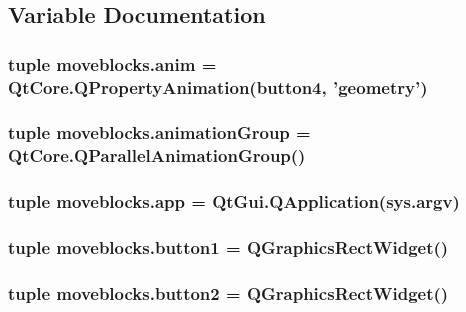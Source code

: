 \subsection{Variable Documentation}
\hypertarget{namespacemoveblocks_aecdb4d8a4bec07feb537fe9bac985194}{}
\subsubsection[{anim}]{\setlength{\rightskip}{0pt plus 5cm}tuple moveblocks.\+anim = Qt\+Core.\+Q\+Property\+Animation({\bf button4}, 'geometry')}\label{namespacemoveblocks_aecdb4d8a4bec07feb537fe9bac985194}
\hypertarget{namespacemoveblocks_afed86a88b85d3bacc416781194493969}{}
\subsubsection[{animation\+Group}]{\setlength{\rightskip}{0pt plus 5cm}tuple moveblocks.\+animation\+Group = Qt\+Core.\+Q\+Parallel\+Animation\+Group()}\label{namespacemoveblocks_afed86a88b85d3bacc416781194493969}
\hypertarget{namespacemoveblocks_ab226ea92062e404c32529795624c87d7}{}
\subsubsection[{app}]{\setlength{\rightskip}{0pt plus 5cm}tuple moveblocks.\+app = Qt\+Gui.\+Q\+Application(sys.\+argv)}\label{namespacemoveblocks_ab226ea92062e404c32529795624c87d7}
\hypertarget{namespacemoveblocks_a38f50e2710ea27cf62af9fa3591708d5}{}
\subsubsection[{button1}]{\setlength{\rightskip}{0pt plus 5cm}tuple moveblocks.\+button1 = {\bf Q\+Graphics\+Rect\+Widget}()}\label{namespacemoveblocks_a38f50e2710ea27cf62af9fa3591708d5}
\hypertarget{namespacemoveblocks_aa10ba442bc10206687f0ee04a05d42e9}{}
\subsubsection[{button2}]{\setlength{\rightskip}{0pt plus 5cm}tuple moveblocks.\+button2 = {\bf Q\+Graphics\+Rect\+Widget}()}\label{namespacemoveblocks_aa10ba442bc10206687f0ee04a05d42e9}
\hypertarget{namespacemoveblocks_ad3643cf235ebca9c5c3d358b61d0f357}{}
